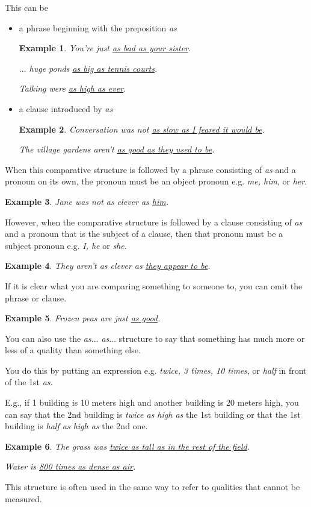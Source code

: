 \documentclass[oneside]{book}
\numberwithin{equation}{section}
\newtheorem{example}{Example}[section]
\begin{document}
%
This can be
\begin{itemize}
    \item a phrase beginning with the preposition \textit{as}
    \begin{example}
        You're just \underline{as bad as your sister}.
        
        $\ldots$ huge ponds \underline{as big as tennis courts}.
        
        Talking were \underline{as high as ever}.
    \end{example}
    \item a clause introduced by \textit{as}
    \begin{example}
        Conversation was not \underline{as slow as I feared it would be}.
        
        The village gardens aren't \underline{as good as they used to be}.
    \end{example}
\end{itemize}
%
\noindent{} When this comparative structure is followed by a phrase consisting of \textit{as} and a pronoun on its own, the pronoun must be an object pronoun e.g. \textit{me, him}, or \textit{her}.
\begin{example}
    Jane was not as clever as \underline{him}.
\end{example}
However, when the comparative structure is followed by a clause consisting of \textit{as} and a pronoun that is the subject of a clause, then that pronoun must be a subject pronoun e.g. \textit{I, he} or \textit{she}.
\begin{example}
    They aren't as clever as \underline{they appear to be}.
\end{example}
%
\noindent{} If it is clear what you are comparing something to someone to, you can omit the phrase or clause.
\begin{example}
    Frozen peas are just \underline{as good}.
\end{example}
%
\noindent{} You can also use the \textit{as$\ldots$ as$\ldots$} structure to say that something has much more or less of a quality than something else.

You do this by putting an expression e.g. \textit{twice, 3 times, 10 times}, or \textit{half} in front of the 1st \textit{as}.

E.g., if 1 building is 10 meters high and another building is 20 meters high, you can say that the 2nd building is \textit{twice as high as} the 1st building or that the 1st building is \textit{half as high as} the 2nd one.
\begin{example}
    The grass was \underline{twice as tall as in the rest of the field}.
    
    Water is \underline{800 times as dense as air}.
\end{example}
This structure is often used in the same way to refer to qualities that cannot be measured.
\end{document}
